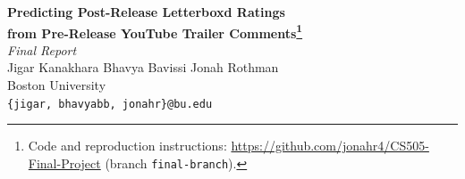 \documentclass[10pt,letterpaper]{article}
\begin{document}
\begin{center}
{\Large\bfseries Predicting Post-Release Letterboxd Ratings\\
from Pre-Release YouTube Trailer Comments\footnote{Code and reproduction
instructions: \url{https://github.com/jonahr4/CS505-Final-Project} (branch
\texttt{final-branch}).}}\\[10pt]
{\large\itshape Final Report}\\[12pt]
{Jigar Kanakhara \quad Bhavya Bavissi \quad Jonah Rothman}\\[2pt]
{Boston University}\\[2pt]
{\texttt{\{jigar, bhavyabb, jonahr\}@bu.edu}}
\end{center}

\vspace{18pt}
\end{document}
